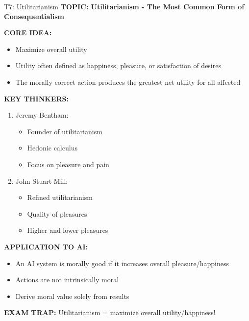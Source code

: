 \documentclass[8pt]{beamer}
\begin{document}
	\begin{frame}{T7: Utilitarianism}
		\fontsize{6.5}{7.5}\selectfont
		\textbf{TOPIC: Utilitarianism - The Most Common Form of Consequentialism}
		
		\vspace{0.1cm}
		\textbf{CORE IDEA:}
		\begin{itemize}
			\item Maximize overall utility
			\item Utility often defined as happiness, pleasure, or satisfaction of desires
			\item The morally correct action produces the greatest net utility for all affected
		\end{itemize}
		
		\vspace{0.1cm}
		\textbf{KEY THINKERS:}
		\begin{enumerate}
			\item \textcolor{myblue}{Jeremy Bentham:}
			\begin{itemize}
				\item Founder of utilitarianism
				\item Hedonic calculus
				\item Focus on pleasure and pain
			\end{itemize}
			\item \textcolor{myblue}{John Stuart Mill:}
			\begin{itemize}
				\item Refined utilitarianism
				\item Quality of pleasures
				\item Higher and lower pleasures
			\end{itemize}
		\end{enumerate}
		
		\vspace{0.1cm}
		\textbf{APPLICATION TO AI:}
		\begin{itemize}
			\item An AI system is morally good if it increases overall pleasure/happiness
			\item Actions are not intrinsically moral
			\item Derive moral value solely from results
		\end{itemize}
		
		\textcolor{myred}{\textbf{EXAM TRAP:}} Utilitarianism = \textcolor{myblue}{maximize overall utility/happiness}!
	\end{frame}
	
\end{document}
